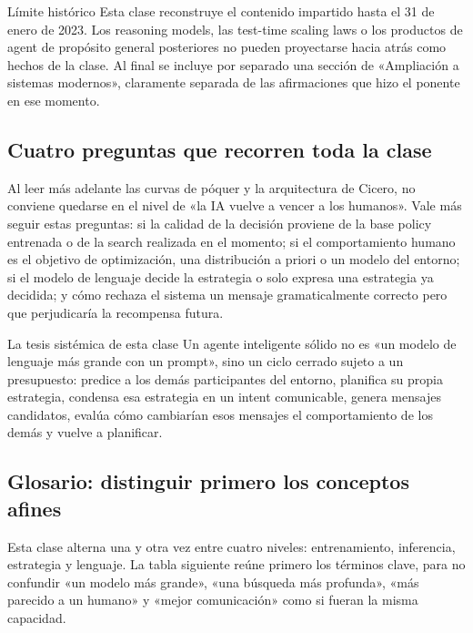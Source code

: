 \begin{warningbox}{Límite histórico}
Esta clase reconstruye el contenido impartido hasta el 31 de enero de 2023. Los reasoning models, las test-time scaling laws o los productos de agent de propósito general posteriores no pueden proyectarse hacia atrás como hechos de la clase. Al final se incluye por separado una sección de «Ampliación a sistemas modernos», claramente separada de las afirmaciones que hizo el ponente en ese momento.
\end{warningbox}

\subsection{Cuatro preguntas que recorren toda la clase}

Al leer más adelante las curvas de póquer y la arquitectura de Cicero, no conviene quedarse en el nivel de «la IA vuelve a vencer a los humanos». Vale más seguir estas preguntas: si la calidad de la decisión proviene de la base policy entrenada o de la search realizada en el momento; si el comportamiento humano es el objetivo de optimización, una distribución a priori o un modelo del entorno; si el modelo de lenguaje decide la estrategia o solo expresa una estrategia ya decidida; y cómo rechaza el sistema un mensaje gramaticalmente correcto pero que perjudicaría la recompensa futura.

\begin{importantbox}{La tesis sistémica de esta clase}
Un agente inteligente sólido no es «un modelo de lenguaje más grande con un prompt», sino un ciclo cerrado sujeto a un presupuesto: predice a los demás participantes del entorno, planifica su propia estrategia, condensa esa estrategia en un intent comunicable, genera mensajes candidatos, evalúa cómo cambiarían esos mensajes el comportamiento de los demás y vuelve a planificar.
\end{importantbox}

\subsection{Glosario: distinguir primero los conceptos afines}

Esta clase alterna una y otra vez entre cuatro niveles: entrenamiento, inferencia, estrategia y lenguaje. La tabla siguiente reúne primero los términos clave, para no confundir «un modelo más grande», «una búsqueda más profunda», «más parecido a un humano» y «mejor comunicación» como si fueran la misma capacidad.


